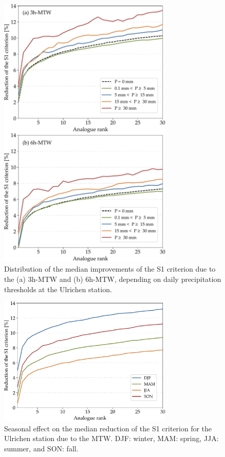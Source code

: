 \documentclass[hess, manuscript]{copernicus}
\begin{document}
	\begin{figure}[htb]
		\begin{center}
			\includegraphics[width=8.3cm]{fig05.pdf}
		\end{center}
		\caption{Distribution of the median improvements of the S1 criterion due to the (a) 3h-MTW and (b) 6h-MTW, depending on daily precipitation thresholds at the Ulrichen station.}
		\label{fig:changes_S1_precip_threshold}
	\end{figure}
	
	\begin{figure}[htb]
		\begin{center}
			\includegraphics[width=8.3cm]{fig06.pdf}
		\end{center}
		\caption{Seasonal effect on the median reduction of the S1 criterion for the Ulrichen station due to the MTW. DJF: winter, MAM: spring, JJA: summer, and SON: fall.}
		\label{fig:changes_S1_seasons}
	\end{figure}
	
\end{document}
